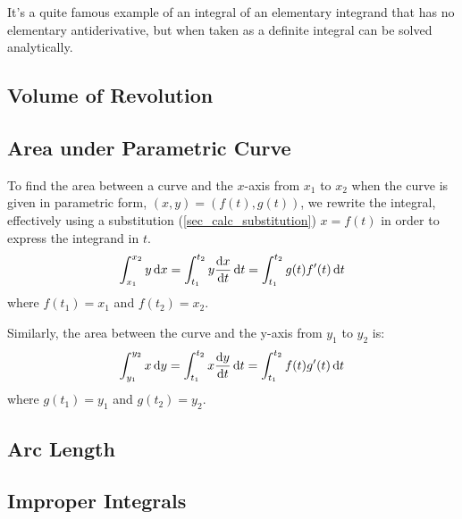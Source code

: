 It's a quite famous example of an integral of an elementary integrand that
has no elementary antiderivative, but when taken as a definite integral can
be solved analytically.

\subsection{Volume of Revolution}

\subsection{Area under Parametric Curve} \label{sec_calc_parametric_area}

To find the area between a curve and the \(x\)-axis from \(x_1\) to \(x_2\)
when the curve is given in parametric form, \((x, y) = (f(t), g(t))\),
we rewrite the integral, effectively using a substitution
(\ref{sec_calc_substitution}) \(x = f(t)\) in order to express the integrand
in \(t\).
\begin{equation}
\integ[x_1]<x_2>{y}{x} =
 \integ[t_1]<t_2>{y \dv<x>{t}}{t} =
 \integ[t_1]<t_2>{g(t)f'(t)}{t}
\end{equation}
where \(f(t_1) = x_1\) and \(f(t_2) = x_2\).

Similarly, the area between the curve and the y-axis from \(y_1\) to \(y_2\)
is:
\begin{equation}
\integ[y_1]<y_2>{x}{y} =
 \integ[t_1]<t_2>{x \dv<y>{t}}{t} =
 \integ[t_1]<t_2>{f(t)g'(t)}{t}
\end{equation}
where \(g(t_1) = y_1\) and \(g(t_2) = y_2\).

\subsection{Arc Length}

\subsection{Improper Integrals}

